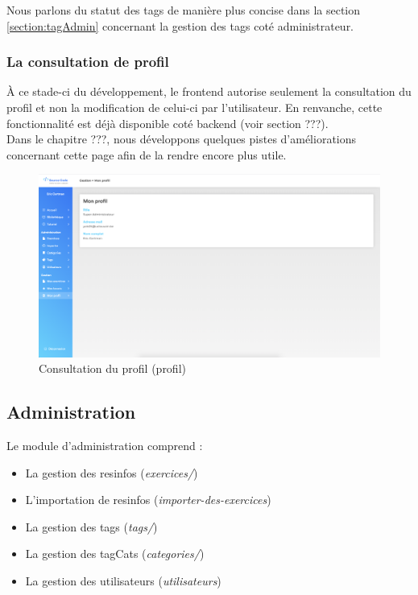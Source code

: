 Nous parlons du statut des \glspl{tag} de manière plus concise dans la section \ref{section:tagAdmin} concernant la gestion des \glspl{tag} coté administrateur.

\subsubsection{La consultation de profil}

À ce stade-ci du développement, le \gls{frontend} autorise seulement la consultation du profil et non la modification de celui-ci par l'utilisateur. En renvanche, cette fonctionnalité est déjà disponible coté backend (voir section ???).\\

Dans le chapitre ???, nous développons quelques pistes d'améliorations concernant cette page afin de la rendre encore plus utile.

\begin{figure}[H]
    \includegraphics[width=\textwidth,height=\textheight,keepaspectratio]{images/client/profile.png}
    \caption[SourceCode : profil]{Consultation du profil (profil)}
\end{figure}

\subsection{Administration}

Le module d'administration comprend :

\begin{itemize}
    \item La gestion des \glspl{resinfo} (\textit{exercices/})
    \item L'importation de \glspl{resinfo} (\textit{importer-des-exercices})
    \item La gestion des \glspl{tag} (\textit{tags/})
    \item La gestion des \glspl{tagCat} (\textit{categories/})
    \item La gestion des utilisateurs (\textit{utilisateurs})
\end{itemize}

